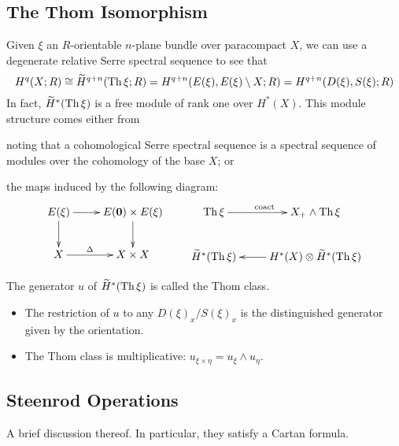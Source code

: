 \documentclass[11pt]{article}
\begin{document}
\subsection{The Thom Isomorphism}
Given $\xi$ an $R$-orientable $n$-plane bundle over paracompact $X$, we can use a degenerate relative Serre spectral sequence to see that
\[{H}^{q}(X;R)\cong \widetilde{H}^{q+n}(\operatorname{Th}\xi;R)={H}^{q+n}(E(\xi),E(\xi)\setminus X;R)={H}^{q+n}(D(\xi),S(\xi);R)\]
In fact, $\widetilde{H}^{*}(\operatorname{Th}\xi)$ is a free module of rank one over ${H}^{*}(X)$. This module structure comes either from
\begin{itemise}
\item noting that a cohomological Serre spectral sequence is a spectral sequence of modules over the cohomology of the base $X$; or
\item the maps induced by the following diagram:
\[\xymatrix{
E(\xi)
\ar[r]
\ar[d]
&%
E(\textbf{0})\times E(\xi)
\ar[d]
\\%
X
\ar[r]^-{\Delta}
&%
X\times X
}\qquad 
\xymatrix{
\Thom \xi
\ar[r]^{\textup{coact}}
&%
X_+\wedge \Thom\xi
\\%
\widetilde{H}^{*}(\Thom\xi)
&%
{H^*(X)}\otimes{\widetilde{H}^{*}(\Thom\xi)}
\ar[l]
}\]
\end{itemise} 
The generator $u$ of $\widetilde{H}^{*}(\operatorname{Th}\xi)$ is called the Thom class.
\begin{itemize}\squishlist
\item The restriction of $u$ to any $D(\xi)_x/S(\xi)_x$ is the distinguished generator given by the orientation.
\item The Thom class is multiplicative: $u_{\xi\times\eta}=u_\xi\wedge u_\eta$.
\end{itemize}
\subsection{Steenrod Operations}
A brief discussion thereof. In particular, they satisfy a Cartan formula.
\end{document}
